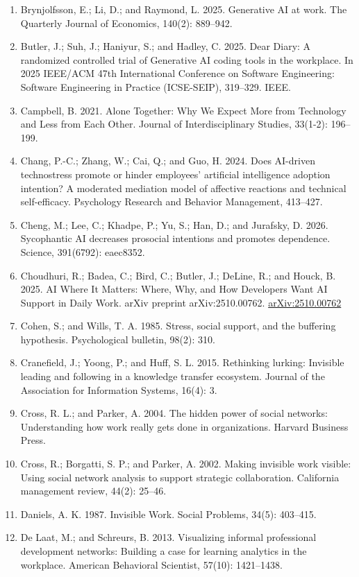 \documentclass[11pt]{article}
\begin{document}
\begin{enumerate}[leftmargin=*]
  \item Brynjolfsson, E.; Li, D.; and Raymond, L. 2025. Generative AI at work. The Quarterly Journal of Economics, 140(2): 889–942.
  \item Butler, J.; Suh, J.; Haniyur, S.; and Hadley, C. 2025. Dear Diary: A randomized controlled trial of Generative AI coding tools in the workplace. In 2025 IEEE/ACM 47th International Conference on Software Engineering: Software Engineering in Practice (ICSE-SEIP), 319–329. IEEE.
  \item Campbell, B. 2021. Alone Together: Why We Expect More from Technology and Less from Each Other. Journal of Interdisciplinary Studies, 33(1-2): 196–199.
  \item Chang, P.-C.; Zhang, W.; Cai, Q.; and Guo, H. 2024. Does AI-driven technostress promote or hinder employees’ artificial intelligence adoption intention? A moderated mediation model of affective reactions and technical self-efficacy. Psychology Research and Behavior Management, 413–427.
  \item Cheng, M.; Lee, C.; Khadpe, P.; Yu, S.; Han, D.; and Jurafsky, D. 2026. Sycophantic AI decreases prosocial intentions and promotes dependence. Science, 391(6792): eaec8352.
  \item Choudhuri, R.; Badea, C.; Bird, C.; Butler, J.; DeLine, R.; and Houck, B. 2025. AI Where It Matters: Where, Why, and How Developers Want AI Support in Daily Work. arXiv preprint arXiv:2510.00762. \href{https://arxiv.org/abs/2510.00762}{arXiv:2510.00762}
  \item Cohen, S.; and Wills, T. A. 1985. Stress, social support, and the buffering hypothesis. Psychological bulletin, 98(2): 310.
  \item Cranefield, J.; Yoong, P.; and Huff, S. L. 2015. Rethinking lurking: Invisible leading and following in a knowledge transfer ecosystem. Journal of the Association for Information Systems, 16(4): 3.
  \item Cross, R. L.; and Parker, A. 2004. The hidden power of social networks: Understanding how work really gets done in organizations. Harvard Business Press.
  \item Cross, R.; Borgatti, S. P.; and Parker, A. 2002. Making invisible work visible: Using social network analysis to support strategic collaboration. California management review, 44(2): 25–46.
  \item Daniels, A. K. 1987. Invisible Work. Social Problems, 34(5): 403–415.
  \item De Laat, M.; and Schreurs, B. 2013. Visualizing informal professional development networks: Building a case for learning analytics in the workplace. American Behavioral Scientist, 57(10): 1421–1438.

\end{enumerate}
\end{document}
